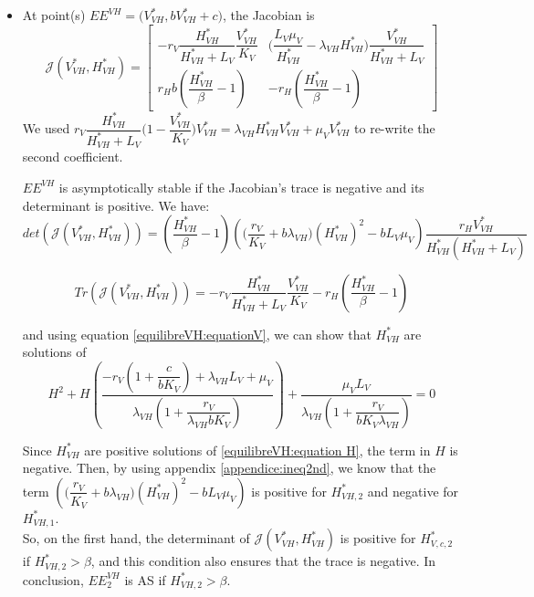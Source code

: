 \documentclass{article}
\newcommand{\lv}{\lambda_{VH}}
\begin{document}
\begin{itemize}
\item At point(s) $EE^{VH} = \Big(V^*_{VH}, b V^*_{VH} + c)$, the Jacobian is
\begin{equation}
\mathcal{J}(V^*_{VH}, H^*_{VH}) = \begin{bmatrix}
-r_V\dfrac{H^*_{VH}}{H^*_{VH} + L_V} \dfrac{V^*_{VH}}{K_V} & \Big(\dfrac{L_V\mu_V}{H^*_{VH}} - \lv H^*_{VH}) \dfrac{V^*_{VH}}{H^*_{VH} + L_V} \\
r_H b (\dfrac{H^*_{VH}}{\beta} - 1) & -r_H(\dfrac{H^*_{VH}}{\beta} - 1)
\end{bmatrix}
\label{stabilityVH:jacobianVH}
\end{equation}
We used $r_V \dfrac{H^*_{VH}}{H^*_{VH} + L_V} \Big(1 - \dfrac{V^*_{VH}}{K_V} \Big)V^*_{VH} = \lv H^*_{VH} V^*_{VH} + \mu_VV^*_{VH}$ to re-write the second coefficient.

$EE^{VH}$ is asymptotically stable if the Jacobian's trace is negative and its determinant is positive. We have:
\begin{equation}
det(\mathcal{J}(V^*_{VH}, H^*_{VH})) = (\dfrac{H^*_{VH}}{\beta} - 1) \left( \Big(\dfrac{r_V}{K_V} + b\lv\Big) (H^*_{VH})^2 - b L_V \mu_V \right) \dfrac{r_H V^*_{VH}}{H^*_{VH}(H^*_{VH} + L_V)}
\end{equation}

\begin{equation}
Tr(\mathcal{J}(V^*_{VH}, H^*_{VH})) = -r_V  \dfrac{H^*_{VH}}{H^*_{VH}+L_V}\dfrac{V^*_{VH}}{K_V} - r_H(\dfrac{H^*_{VH}}{\beta} - 1)
\end{equation}

and using equation \eqref{equilibreVH:equationV}, we can show that $H^*_{VH}$ are solutions of
\begin{equation}
H^2 + H \left( \dfrac{-r_V(1 + \dfrac{c}{bK_V}) + \lv L_V + \mu_V}{\lv(1 + \dfrac{r_V}{\lv bK_V})} \right) + \dfrac{\mu_V L_V}{\lv(1 + \dfrac{r_V}{bK_V\lv})} = 0
\label{equilibreVH:equation H}
\end{equation}

Since $H^*_{VH}$ are positive solutions of \eqref{equilibreVH:equation H}, the term in $H$ is negative. Then, by using appendix \ref{appendice:ineq2nd}, we know that the term $\left( \Big(\dfrac{r_V}{K_V} + b\lv\Big) (H^*_{VH})^2 - b L_V \mu_V \right)$ is positive for $H^*_{VH, 2}$ and negative for $H^*_{VH, 1}$.
\\

So, on the first hand, the determinant of $\mathcal{J}(V^*_{VH}, H^*_{VH})$ is positive for $H^*_{V, c, 2}$ if $H^*_{VH, 2} > \beta$, and this condition also ensures that the trace is negative. In conclusion, $EE^{VH}_2$ is AS if $H^*_{VH, 2} > \beta$.
\\


\end{itemize}
\end{document}
